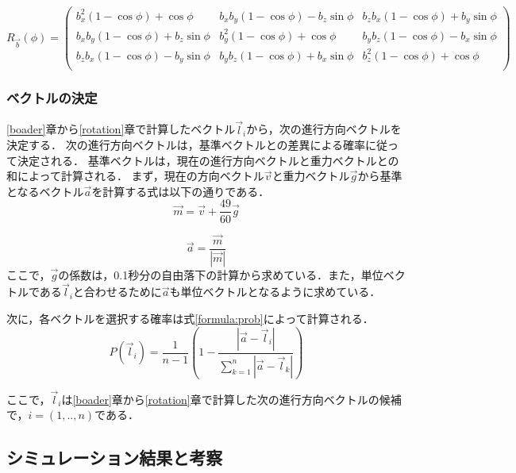 \documentclass[a4paper,11pt]{jarticle}
\begin{document}
	\begin{equation}
	\label{formula:rotation}
	R_{\vec{b}}(\phi)=\left( \begin{array}{ccc}
	b_x^2(1-\cos\phi)+\cos\phi & b_x b_y (1-\cos\phi) - b_z\sin\phi & b_z b_x (1-\cos\phi) + b_y\sin\phi \\
	b_x b_y (1-\cos\phi)+b_z \sin\phi & b_y^2 (1-\cos\phi) + \cos\phi & b_y b_z (1-\cos\phi) - b_x\sin\phi \\
	b_z b_x (1-\cos\phi)- b_y\sin\phi & b_y b_z (1-\cos\phi) + b_x \sin\phi & b_z^2 (1-\cos\phi) + \cos\phi \\
	\end{array} \right)
	\end{equation}
	
	\subsubsection{ベクトルの決定}
	\ref{boader}章から\ref{rotation}章で計算したベクトル$\vec{l}_i$から，次の進行方向ベクトルを決定する．
	次の進行方向ベクトルは，基準ベクトルとの差異による確率に従って決定される．
	基準ベクトルは，現在の進行方向ベクトルと重力ベクトルとの和によって計算される．
	まず，現在の方向ベクトル$ \vec{v} $と重力ベクトル$ \vec{g} $から基準となるベクトル$ \vec{a} $を計算する式は以下の通りである．
	\begin{equation}
	\vec{m} = \vec{v} +\frac{49}{60} \vec{g} 
	\end{equation}

	\begin{equation}
		\vec{a} = \frac{\vec{m}}{|\vec{m}|}
	\end{equation}
	ここで，$ \vec{g} $の係数は，0.1秒分の自由落下の計算から求めている．また，単位ベクトルである$\vec{l}_i$と合わせるために$\vec{a}$も単位ベクトルとなるように求めている．
	
	次に，各ベクトルを選択する確率は式\ref{formula:prob}によって計算される．
	\begin{equation}
	\label{formula:prob}
	P(\vec{l}_i) = \frac{1}{n-1}(1 - \frac{|\vec{a} - \vec{l}_i |}{\sum_{k=1}^{n}|\vec{a} - \vec{l}_k|})
	\end{equation}
	
	ここで，$ \vec{l}_i $は\ref{boader}章から\ref{rotation}章で計算した次の進行方向ベクトルの候補で，$ i = (1, .. ,n) $である．
	
	\subsection{シミュレーション結果と考察}
\end{document}
